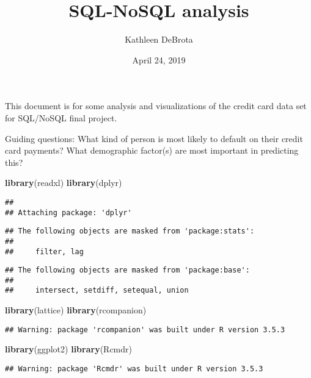 \documentclass[]{article}
\title{SQL-NoSQL analysis}
\author{Kathleen DeBrota}
\date{April 24, 2019}
\newenvironment{Shaded}{\begin{snugshade}}{\end{snugshade}}
\newcommand{\KeywordTok}[1]{\textcolor[rgb]{0.13,0.29,0.53}{\textbf{#1}}}
\newcommand{\NormalTok}[1]{#1}
\begin{document}
\maketitle

This document is for some analysis and visualizations of the credit card
data set for SQL/NoSQL final project.

Guiding questions: What kind of person is most likely to default on
their credit card payments? What demographic factor(s) are most
important in predicting this?

\begin{Shaded}
\begin{Highlighting}[]
\KeywordTok{library}\NormalTok{(readxl)}
\KeywordTok{library}\NormalTok{(dplyr)}
\end{Highlighting}
\end{Shaded}

\begin{verbatim}
## 
## Attaching package: 'dplyr'
\end{verbatim}

\begin{verbatim}
## The following objects are masked from 'package:stats':
## 
##     filter, lag
\end{verbatim}

\begin{verbatim}
## The following objects are masked from 'package:base':
## 
##     intersect, setdiff, setequal, union
\end{verbatim}

\begin{Shaded}
\begin{Highlighting}[]
\KeywordTok{library}\NormalTok{(lattice)}
\KeywordTok{library}\NormalTok{(rcompanion)}
\end{Highlighting}
\end{Shaded}

\begin{verbatim}
## Warning: package 'rcompanion' was built under R version 3.5.3
\end{verbatim}

\begin{Shaded}
\begin{Highlighting}[]
\KeywordTok{library}\NormalTok{(ggplot2)}
\KeywordTok{library}\NormalTok{(Rcmdr)}
\end{Highlighting}
\end{Shaded}

\begin{verbatim}
## Warning: package 'Rcmdr' was built under R version 3.5.3
\end{verbatim}
\end{document}
